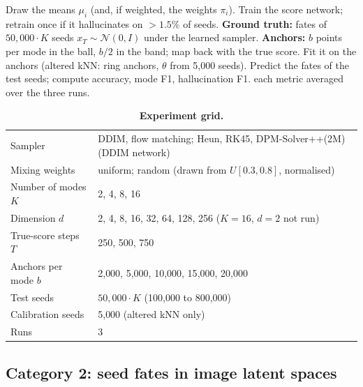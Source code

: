 \documentclass[11pt]{article}
\begin{document}
\begin{algorithm}[htbp]
\caption{Evaluation protocol for one configuration (sampler, mixture variant, $K$, $d$, $T$, $b$)}
\label{alg:protocol}
\begin{algorithmic}[1]
  \State Draw the means $\mu_i$ (and, if weighted, the weights $\pi_i$).
  \State Train the score network; retrain once if it hallucinates on $> 1.5\%$ of seeds.
  \State \textbf{Ground truth:} fates of $50{,}000 \cdot K$ seeds $x_T \sim \mathcal{N}(0, I)$ under the learned sampler.
  \State \textbf{Anchors:} $b$ points per mode in the ball, $b/2$ in the band; map back with the true score.
    \State Fit it on the anchors (altered kNN: ring anchors, $\theta$ from 5{,}000 seeds).
    \State Predict the fates of the test seeds; compute accuracy, mode F1, hallucination F1.
  \EndFor
\EndFor
\State \Return each metric averaged over the three runs.
\end{algorithmic}
\end{algorithm}

\begin{table}[htbp]
\centering
\small
\caption{\textbf{Experiment grid.}}
\label{tab:grid}
\begin{tabular}{ll}
\toprule
Sampler                         & DDIM, flow matching; Heun, RK45, DPM-Solver++(2M) (DDIM network) \\
Mixing weights                  & uniform; random (drawn from $U[0.3, 0.8]$, normalised) \\
Number of modes $K$             & 2, 4, 8, 16 \\
Dimension $d$                   & 2, 4, 8, 16, 32, 64, 128, 256 ($K = 16$, $d = 2$ not run) \\
True-score steps $T$            & 250, 500, 750 \\
Anchors per mode $b$            & 2{,}000, 5{,}000, 10{,}000, 15{,}000, 20{,}000 \\
Test seeds                      & $50{,}000 \cdot K$ (100{,}000 to 800{,}000) \\
Calibration seeds               & 5{,}000 (altered kNN only) \\
Runs                            & 3 \\
\bottomrule
\end{tabular}
\end{table}

\FloatBarrier
\subsection{Category 2: seed fates in image latent spaces}
\end{document}
